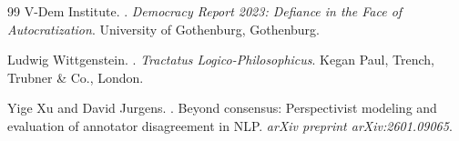 \documentclass[12pt]{article}
\begin{document}
\begin{thebibliography}{99}
V-Dem Institute.
.
\newblock \emph{Democracy Report 2023: Defiance in the Face of Autocratization}.
\newblock University of Gothenburg, Gothenburg.

Ludwig Wittgenstein.
.
\newblock \emph{Tractatus Logico-Philosophicus}.
\newblock Kegan Paul, Trench, Trubner \& Co., London.

Yige Xu and David Jurgens.
.
\newblock Beyond consensus: Perspectivist modeling and evaluation of annotator disagreement in NLP.
\newblock \emph{arXiv preprint arXiv:2601.09065}.

\end{thebibliography}
\end{document}
